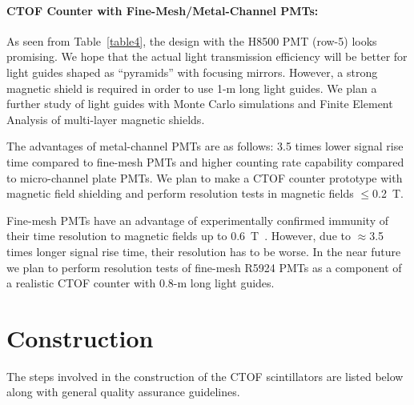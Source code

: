 \paragraph{CTOF Counter with Fine-Mesh/Metal-Channel PMTs:}

As seen from Table~\ref{table4}, the design with the H8500 PMT (row-5) looks 
promising.  We hope that the actual light transmission efficiency will be 
better for light guides shaped as ``pyramids'' with focusing mirrors.  However, 
a strong magnetic shield is required in order to use 1-m long light guides. 
We plan a further study of light guides with Monte Carlo simulations and Finite 
Element Analysis of multi-layer magnetic shields.

The advantages of metal-channel PMTs are as follows: 3.5 times lower signal 
rise time compared to fine-mesh PMTs and higher counting rate capability 
compared to micro-channel plate PMTs.  We plan to make a CTOF counter 
prototype with magnetic field shielding and perform resolution tests in 
magnetic fields $\leq$0.2~T.

Fine-mesh PMTs have an advantage of experimentally confirmed immunity of 
their time resolution to magnetic fields up to 0.6~T~\cite{fmtr01}.  However, 
due to $\approx$3.5 times longer signal rise time, their resolution has to be  
worse.  In the near future we plan to perform resolution tests of fine-mesh 
R5924 PMTs as a component of a realistic CTOF counter with 0.8-m long light 
guides.  

\section{Construction}
 
The steps involved in the construction of the CTOF scintillators are listed 
below along with general quality assurance guidelines.

